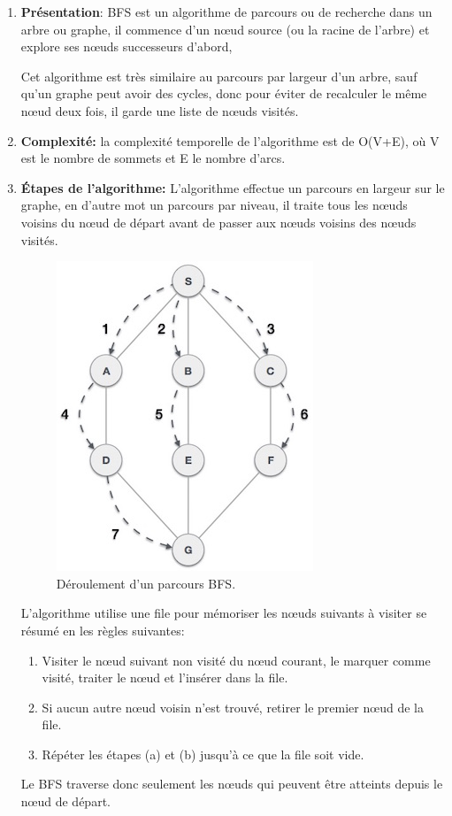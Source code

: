 \begin{enumerate}
	\item \textbf{Présentation}: BFS est un algorithme de parcours ou de recherche dans un arbre ou graphe, il commence d'un nœud source (ou la racine de l'arbre) et explore ses nœuds successeurs d'abord, 

Cet algorithme est très similaire au parcours par largeur d'un arbre, sauf qu'un graphe peut avoir des cycles, donc pour éviter de recalculer le même nœud deux fois, il garde une liste de nœuds visités.

	\item \textbf{Complexité:} la complexité temporelle de l'algorithme est de O(V+E), où V est le nombre de sommets et E le nombre d'arcs.
	
	\item \textbf{Étapes de l'algorithme:}
		L'algorithme effectue un parcours en largeur sur le graphe, en d'autre mot un parcours par niveau, il traite tous les nœuds voisins du nœud de départ avant de passer aux nœuds voisins des nœuds visités.
\begin{figure}
	\center
	\includegraphics[scale=0.6]{img/BFS.jpg}
	\caption{Déroulement d'un parcours BFS.}
\end{figure}		
L'algorithme utilise une file pour mémoriser les nœuds suivants à visiter se résumé en les règles suivantes:
	\begin{enumerate}
		\item Visiter le nœud suivant non visité du nœud courant, le marquer comme visité, traiter le nœud et l'insérer dans la file.
		\item Si aucun autre nœud voisin n'est trouvé, retirer le premier nœud de la file.
		\item Répéter les étapes (a) et (b) jusqu'à ce que la file soit vide.
	\end{enumerate}
	Le BFS traverse donc seulement les nœuds qui peuvent être atteints depuis le nœud de départ\cite{refBFS}.
\end{enumerate}

